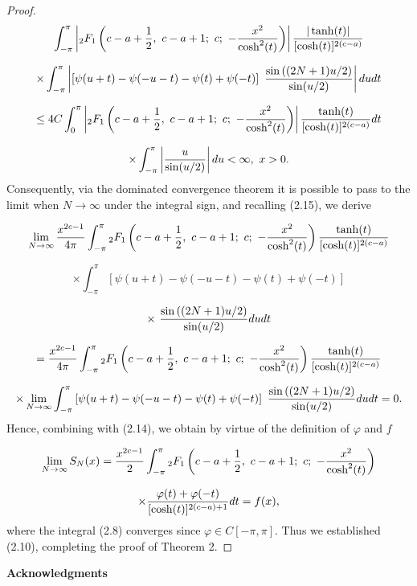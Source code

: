 \documentclass[twoside,12pt]{article}
\begin{document}
\begin{proof}
$$ \int_{-\pi}^\pi  \left| {}_2F_1\left(c-a+ {1\over 2},\  c-a +1; \ c;\  - {x^2\over \cosh^2(t)} \right) \right| { | \tanh(t)|   \over [\cosh(t)]^{ 2(c-a) } }  $$

$$\times \int_{ -\pi}^{\pi} \left| \left[ \psi(u+t)- \psi(-u-t)  - \psi(t) + \psi (-t) \right]  \  {\sin \left((2N+1) u/2 \right)\over \sin( u /2)}  \right| du dt$$

$$\le  4 C \int_{0}^\pi  \left| {}_2F_1\left(c-a+ {1\over 2},\  c-a +1; \ c;\  - {x^2\over \cosh^2(t)} \right) \right| {  \tanh(t)  \over [\cosh(t)]^{ 2(c-a) } }  dt $$

$$\times   \int_{ -\pi}^{\pi}   \left| {u\over \sin( u /2)} \right| du < \infty,\ x >0.$$
%
Consequently, via  the dominated convergence theorem it is possible to pass to the limit when $N \to \infty$ under the  integral sign, and recalling (2.15), we derive

$$  \lim_{N \to \infty}   { x^{2c-1}\over 4\pi }  \int_{-\pi}^\pi  {}_2F_1\left(c-a+ {1\over 2},\  c-a +1; \ c;\  - {x^2\over \cosh^2(t)} \right) { \tanh(t)   \over [\cosh(t)]^{ 2(c-a) } }  $$

$$\times  \int_{ -\pi}^{\pi}  \left[ \psi(u+t)- \psi(-u-t)  - \psi(t) + \psi (-t) \right] $$

$$\times  \  {\sin \left((2N+1) u/2 \right)\over \sin( u /2)}  du dt $$

$$=  {x^{2c-1}  \over 4\pi }  \int_{-\pi}^\pi  {}_2F_1\left(c-a+ {1\over 2},\  c-a +1; \ c;\  - {x^2\over \cosh^2(t)} \right) { \tanh(t)   \over [\cosh(t)]^{ 2(c-a) } }    $$

$$ \times \lim_{N \to \infty}  \int_{ -\pi}^{\pi}  \left[ \psi(u+t)- \psi(-u-t)  - \psi(t) + \psi (-t) \right]  \  {\sin \left((2N+1) u/2 \right)\over \sin( u /2)}  du dt = 0.$$
%
Hence, combining with (2.14),  we obtain  by virtue of  the definition of $\varphi$ and $f$

$$ \lim_{N \to \infty}  S_N(x) =   {x^{2c-1} \over 2}    \int_{-\pi}^\pi   {}_2F_1\left(c-a+ {1\over 2},\  c-a +1; \ c;\  - {x^2\over \cosh^2(t)} \right)$$

$$\times  {  \varphi (t)+ \varphi(-t)  \over [\cosh(t)]^{ 2(c-a)+1 } }dt = f(x),$$
%
where the integral (2.8) converges since $\varphi \in C[-\pi,\pi]$.  Thus we established  (2.10), completing the proof of Theorem 2.
 
\end{proof} 





\bigskip
\centerline{{\bf Acknowledgments}}
\bigskip
\end{document}
